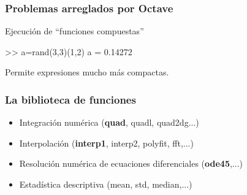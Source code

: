 \begin{frame}[containsverbatim]
\frametitle{Problemas arreglados por Octave}

Ejecución de ``funciones compuestas''
\begin{Octave}
>> a=rand(3,3)(1,2) 
a =  0.14272
\end{Octave}

Permite expresiones mucho más compactas.

\end{frame}



\hypertarget{la-biblioteca-de-funciones}{}
\begin{frame}\frametitle{La biblioteca de funciones}
\begin{itemize}
  \setlength{\itemsep}{0.7em}
\item {} 
  Integración numérica (\textbf{quad}, quadl, quad2dg...)

\item {} 
  Interpolación (\textbf{interp1}, interp2, polyfit, fft,...)

\item {} 
  Resolución numérica de ecuaciones diferenciales (\textbf{ode45},...)

\item {} 
Estadística descriptiva (mean, std, median,...)

\end{itemize}




\end{frame}


